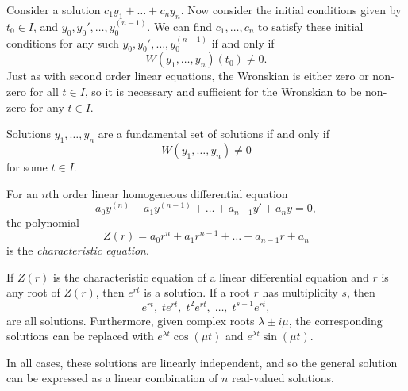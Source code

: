 \begin{thm}
    Consider a solution $c_1y_1 + \ldots + c_ny_n$. Now consider the initial conditions given by $t_0 \in I$, and $y_0, y_0', \ldots, y_0^{(n-1)}$. We can find $c_1, \ldots, c_n$ to satisfy these initial conditions for any such $y_0, y_0', \ldots, y_0^{(n-1)}$ if and only if
    \[W(y_1, \ldots, y_n)(t_0) \neq 0.\] Just as with second order linear equations, the Wronskian is either zero or non-zero for all $t \in I$, so it is necessary and sufficient for the Wronskian to be non-zero for any $t \in I$.
\end{thm}

\begin{prop}
    Solutions $y_1, \ldots, y_n$ are a fundamental set of solutions if and only if
    \[W(y_1, \ldots, y_n) \neq 0\] for some $t \in I$.
\end{prop}

\begin{defn}
    For an $n$th order linear homogeneous differential equation
    \[a_0y^{(n)} + a_1y^{(n-1)} + \ldots + a_{n-1}y' + a_ny = 0,\]
    the polynomial
    \[Z(r) = a_0r^n + a_1r^{n-1} + \ldots + a_{n-1}r + a_n\] is the \emph{characteristic equation}.
\end{defn}

\begin{prop}
    If $Z(r)$ is the characteristic equation of a linear differential equation and $r$ is any root of $Z(r)$, then $e^{rt}$ is a solution. If a root $r$ has multiplicity $s$, then
    \[e^{rt},\; te^{rt},\; t^2e^{rt},\; \ldots,\; t^{s-1}e^{rt},\]
    are all solutions. Furthermore, given complex roots $\lambda \pm i\mu$, the corresponding solutions can be replaced with $e^{\lambda t}\cos(\mu t)$ and $e^{\lambda t}\sin(\mu t)$.

    In all cases, these solutions are linearly independent, and so the general solution can be expressed as a linear combination of $n$ real-valued solutions.
\end{prop}
